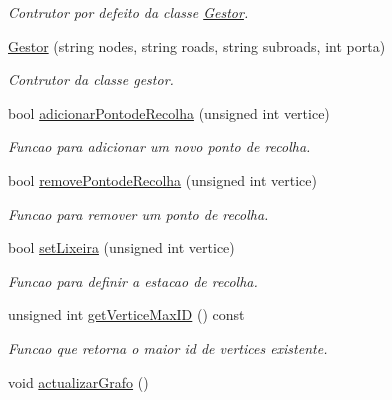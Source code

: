 \begin{DoxyCompactItemize}
\begin{DoxyCompactList}\small\item\em Contrutor por defeito da classe \hyperlink{class_gestor}{Gestor}. \end{DoxyCompactList}\item 
\hyperlink{class_gestor_a6eb5f552606a9727338f08567af780c2}{Gestor} (string nodes, string roads, string subroads, int porta)
\begin{DoxyCompactList}\small\item\em Contrutor da classe gestor. \end{DoxyCompactList}\item 
bool \hyperlink{class_gestor_a6c3b21acf2962ecf159136db3a8bd715}{adicionar\-Pontode\-Recolha} (unsigned int vertice)
\begin{DoxyCompactList}\small\item\em Funcao para adicionar um novo ponto de recolha. \end{DoxyCompactList}\item 
bool \hyperlink{class_gestor_ac380d3e83b9fcaea5b91fe805445ed90}{remove\-Pontode\-Recolha} (unsigned int vertice)
\begin{DoxyCompactList}\small\item\em Funcao para remover um ponto de recolha. \end{DoxyCompactList}\item 
bool \hyperlink{class_gestor_aa8372dcadceed12c0879ae0192a0807b}{set\-Lixeira} (unsigned int vertice)
\begin{DoxyCompactList}\small\item\em Funcao para definir a estacao de recolha. \end{DoxyCompactList}\item 
unsigned int \hyperlink{class_gestor_af16fb9e19400257f96fc0faddd5b51e9}{get\-Vertice\-Max\-I\-D} () const 
\begin{DoxyCompactList}\small\item\em Funcao que retorna o maior id de vertices existente. \end{DoxyCompactList}\item 
\hypertarget{class_gestor_a1e41facfae61e3217ada47155d927bd3}{void \hyperlink{class_gestor_a1e41facfae61e3217ada47155d927bd3}{actualizar\-Grafo} ()}\label{class_gestor_a1e41facfae61e3217ada47155d927bd3}


\end{DoxyCompactItemize}
